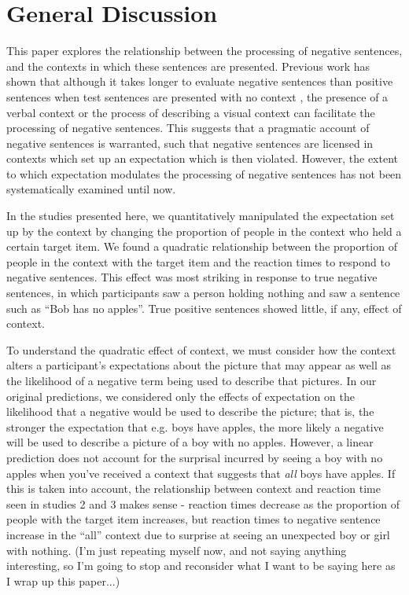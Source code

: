 \documentclass[man]{apa2}
\begin{document}
\section{General Discussion}

This paper explores the relationship between the processing of negative sentences, and the contexts in which these sentences are presented.  Previous work has shown that although it takes longer to evaluate negative sentences than positive sentences when test sentences are presented with no context \cite{carpenter1975, just1971, just1976, hclark1972}, the presence of a verbal context \cite{dale2011, glenberg1999, ludtke2006} or the process of describing a visual context \cite{wason1965} can facilitate the processing of negative sentences.  This suggests that a pragmatic account of negative sentences is warranted, such that negative sentences are licensed in contexts which set up an expectation which is then violated.  However, the extent to which expectation modulates the processing of negative sentences has not been systematically examined until now.  

In the studies presented here, we quantitatively manipulated the expectation set up by the context by changing the proportion of people in the context who held a certain target item.  We found a quadratic relationship between the proportion of people in the context with the target item and the reaction times to respond to negative sentences.  This effect was most striking in response to true negative sentences, in which participants saw a person holding nothing and saw a sentence such as ``Bob has no apples''.  True positive sentences showed little, if any, effect of context.  

To understand the quadratic effect of context, we must consider how the context alters a participant's expectations about the picture that may appear as well as the likelihood of a negative term being used to describe that pictures.  In our original predictions, we considered only the effects of expectation on the likelihood that a negative would be used to describe the picture; that is, the stronger the expectation that e.g. boys have apples, the more likely a negative will be used to describe a picture of a boy with no apples.  However, a linear prediction does not account for the surprisal incurred by seeing a boy with no apples when you've received a context that suggests that \emph{all} boys have apples.  If this is taken into account, the relationship between context and reaction time seen in studies 2 and 3 makes sense - reaction times decrease as the proportion of people with the target item increases, but reaction times to negative sentence increase in the ``all'' context due to surprise at seeing an unexpected boy or girl with nothing.  (I'm just repeating myself now, and not saying anything interesting, so I'm going to stop and reconsider what I want to be saying here as I wrap up this paper...)



\setlength{\bibleftmargin}{.125in}
\setlength{\bibindent}{-\bibleftmargin}


\end{document}
